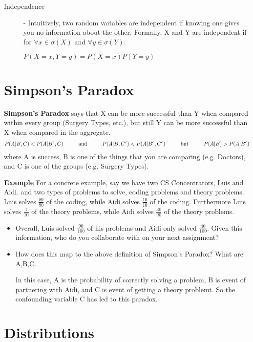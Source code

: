 \documentclass[11pt]{article}
\begin{document}
\begin{description}
\begin{description}
\item[Independence] - Intuitively, two random variables are independent if knowing one gives you no information about the other. Formally, X and Y are independent if for $\forall x \in \sigma(X)$ and $\forall y \in \sigma(Y)$:
\begin{center}
$P(X=x, Y=y) = P(X = x)P(Y = y)$
\end{center}

\end{description}

\section*{Simpson's Paradox}
\textbf{Simpson's Paradox} says that X can be more successful than Y when compared within every group (Surgery Types, etc.), but still Y can be more successful than X when compared in the aggregate.
\begin{align*}
  P(A|B, C) < P(A|B^c, C) \hskip 1cm \textnormal{and}  \hskip 1cm P(A|B, C^c) < P(A|B^c, C^c)  \hskip 1cm \textnormal{but} \hskip 1cm P(A|B) > P(A|B^c)
\end{align*}
where A is success, B is one of the things that you are comparing (e.g. Doctors), and C is one of the groups (e.g. Surgery Types).

\textbf{Example} For a concrete example, say we have two CS Concentrators, Luis and Aidi. and two types of problems to solve, coding problems and theory problems. Luis solves $\frac{89}{90}$ of the coding, while Aidi solves $\frac{10}{10}$ of the coding. Furthermore Luis solves $\frac{1}{10}$ of the theory problems, while Aidi solves $\frac{30}{90}$ of the theory problems.
\begin{itemize}
\item Overall, Luis solved $\frac{90}{100}$ of his problems and Aidi only solved $\frac{40}{100}$. Given this information, who do you collaborate with on your next assignment?
\item How does this map to the above definition of Simpson's Paradox? What are A,B,C.
\begin{solution}
In this case, A is the probability of correctly solving a problem, B is event of partnering with Aidi, and C is event of getting a theory problemt. So the confounding variable C has led to this paradox.
\end{solution}
\end{itemize}

\section*{Distributions}


\end{description}
\end{document}
